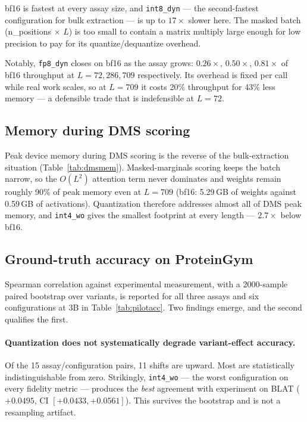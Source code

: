 \documentclass[11pt]{article}
\newcommand{\cfg}[1]{\texttt{#1}}
\begin{document}
bf16 is fastest at every assay size, and \cfg{int8\_dyn} --- the second-fastest
configuration for bulk extraction --- is up to $17\times$ slower here. The
masked batch (n\_positions $\times$ $L$) is too small to contain a matrix
multiply large enough for low precision to pay for its quantize/dequantize
overhead.

Notably, \cfg{fp8\_dyn} closes on bf16 as the assay grows: $0.26\times$,
$0.50\times$, $0.81\times$ of bf16 throughput at $L = 72, 286, 709$
respectively. Its overhead is fixed per call while real work scales, so at
$L=709$ it costs 20\% throughput for 43\% less memory --- a defensible trade
that is indefensible at $L=72$.

\subsection{Memory during DMS scoring}
\label{sec:dmsmem}

Peak device memory during DMS scoring is the reverse of the bulk-extraction
situation (Table~\ref{tab:dmsmem}). Masked-marginals scoring keeps the batch
narrow, so the $O(L^2)$ attention term never dominates and weights remain
roughly 90\% of peak memory even at $L=709$ (bf16: 5.29\,GB of weights against
0.59\,GB of activations). Quantization therefore addresses almost all of DMS
peak memory, and \cfg{int4\_wo} gives the smallest footprint at every length ---
$2.7\times$ below bf16.

\subsection{Ground-truth accuracy on ProteinGym}
\label{sec:gt}

Spearman correlation against experimental measurement, with a 2000-sample
paired bootstrap over variants, is reported for all three assays and six
configurations at 3B in Table~\ref{tab:pilotacc}. Two findings emerge, and the
second qualifies the first.

\paragraph{Quantization does not systematically degrade variant-effect
accuracy.} Of the 15 assay/configuration pairs, 11 shifts are upward. Most are
statistically indistinguishable from zero. Strikingly, \cfg{int4\_wo} --- the
worst configuration on every fidelity metric --- produces the \emph{best}
agreement with experiment on BLAT ($+0.0495$, CI $[+0.0433, +0.0561]$). This
survives the bootstrap and is not a resampling artifact.
\end{document}
